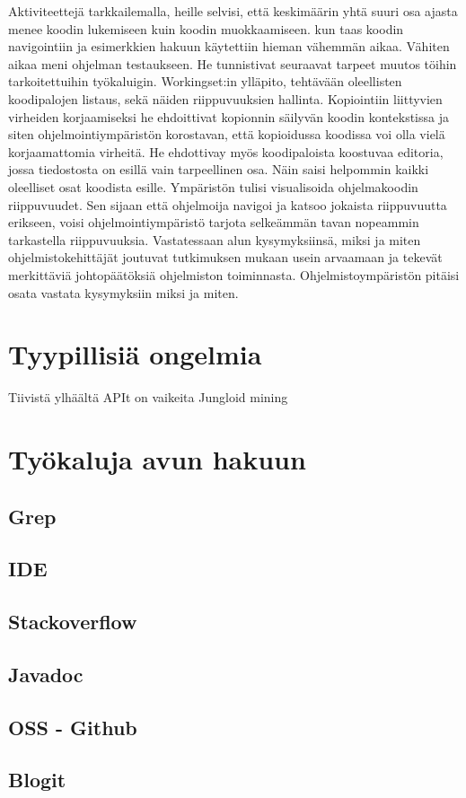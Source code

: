 \documentclass[finnish]{../tktltiki2}
\theoremstyle{definition}
\theoremstyle{remark}
\begin{document}
Aktiviteettejä tarkkailemalla, heille selvisi, että keskimäärin yhtä suuri osa ajasta menee koodin lukemiseen kuin koodin muokkaamiseen. kun taas koodin navigointiin ja esimerkkien hakuun käytettiin hieman vähemmän aikaa. Vähiten aikaa meni ohjelman testaukseen.
He tunnistivat seuraavat tarpeet muutos töihin tarkoitettuihin työkaluigin.
Workingset:in ylläpito, tehtävään oleellisten koodipalojen listaus, sekä näiden riippuvuuksien hallinta. Kopiointiin liittyvien virheiden korjaamiseksi he ehdoittivat kopionnin säilyvän koodin kontekstissa ja siten ohjelmointiympäristön korostavan, että kopioidussa koodissa voi olla vielä korjaamattomia virheitä.
He ehdottivay myös koodipaloista koostuvaa editoria, jossa tiedostosta on esillä vain tarpeellinen osa. Näin saisi helpommin kaikki oleelliset osat koodista esille.
Ympäristön tulisi visualisoida ohjelmakoodin riippuvuudet. Sen sijaan että ohjelmoija navigoi ja katsoo jokaista riippuvuutta erikseen, voisi ohjelmointiympäristö tarjota selkeämmän tavan nopeammin tarkastella riippuvuuksia.
Vastatessaan alun kysymyksiinsä, miksi ja miten ohjelmistokehittäjät joutuvat tutkimuksen mukaan usein arvaamaan ja tekevät merkittäviä johtopäätöksiä ohjelmiston toiminnasta. Ohjelmistoympäristön pitäisi osata vastata kysymyksiin miksi ja miten. %

\section{Tyypillisiä ongelmia}
Tiivistä ylhäältä
APIt on vaikeita
  Jungloid mining

\section{Työkaluja avun hakuun}
\subsection{Grep}
\subsection{IDE}

\subsection{Stackoverflow}
\subsection{Javadoc}
\subsection{OSS - Github}
\subsection{Blogit}




\end{document}
